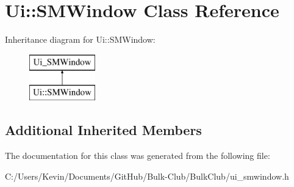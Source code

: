 \hypertarget{class_ui_1_1_s_m_window}{}\section{Ui\+:\+:S\+M\+Window Class Reference}
\label{class_ui_1_1_s_m_window}
Inheritance diagram for Ui\+:\+:S\+M\+Window\+:\begin{figure}[H]
\begin{center}
\leavevmode
\includegraphics[height=2.000000cm]{class_ui_1_1_s_m_window}
\end{center}
\end{figure}
\subsection*{Additional Inherited Members}


The documentation for this class was generated from the following file\+:\begin{DoxyCompactItemize}
\item 
C\+:/\+Users/\+Kevin/\+Documents/\+Git\+Hub/\+Bulk-\/\+Club/\+Bulk\+Club/ui\+\_\+smwindow.\+h\end{DoxyCompactItemize}
